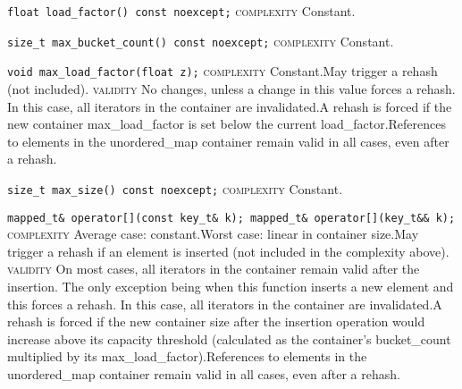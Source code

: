 \noindent{}\hspace*{0.25em}\lstinline[basicstyle=\ttfamily\color{cgreen}]{float load_factor() const noexcept;} \textsc{complexity} Constant.\\\vspace{-0.6em}

\noindent{}\hspace*{0.25em}\lstinline[basicstyle=\ttfamily\color{cgreen}]{size_t max_bucket_count() const noexcept;} \textsc{complexity} Constant.\\\vspace{-0.6em}

\noindent{}\hspace*{0.25em}\lstinline[basicstyle=\ttfamily\color{cgreen}]{void max_load_factor(float z);} \textsc{complexity} Constant.May trigger a rehash (not included). \textsc{validity} No changes, unless a change in this value forces a rehash. In this case, all iterators in the container are invalidated.A rehash is forced if the new container max\_load\_factor is set below the current load\_factor.References to elements in the unordered\_map container remain valid in all cases, even after a rehash.\\\vspace{-0.6em}

\noindent{}\hspace*{0.25em}\lstinline[basicstyle=\ttfamily\color{cgreen}]{size_t max_size() const noexcept;} \textsc{complexity} Constant.\\\vspace{-0.6em}

\noindent{}\hspace*{0.25em}\lstinline[basicstyle=\ttfamily\color{corange}]{mapped_t& operator[](const key_t& k); mapped_t& operator[](key_t&& k);} \textsc{complexity} Average case: constant.Worst case: linear in container size.May trigger a rehash if an element is inserted (not included in the complexity above). \textsc{validity} On most cases, all iterators in the container remain valid after the insertion. The only exception being when this function inserts a new element and this forces a rehash. In this case, all iterators in the container are invalidated.A rehash is forced if the new container size after the insertion operation would increase above its capacity threshold (calculated as the container's bucket\_count multiplied by its max\_load\_factor).References to elements in the unordered\_map container remain valid in all cases, even after a rehash.\\\vspace{-0.6em}

